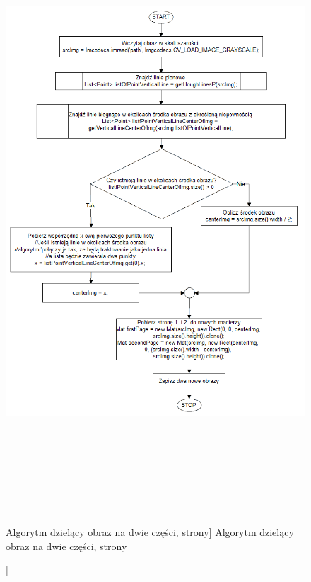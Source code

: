 \documentclass[a4paper,12pt]{article}
\begin{document}
    	        \begin{figure}[!ht]  
    			    \begin{center}
    				  \includegraphics[height=22.5cm]{image//algorithm//divideToPage.png} 
    			    \end{center}
    			    \caption
        			    [Algorytm dzielący obraz na dwie części, strony]
        			    {Algorytm dzielący obraz na dwie części, strony}  
        			    \label{fig:imgToTwo}
    		    \end{figure}
    		
    		\newpage
    		
\end{document}
